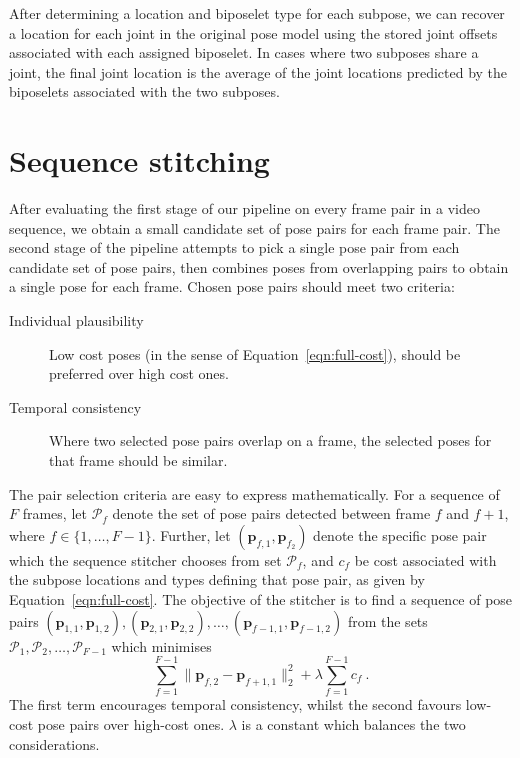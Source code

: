 \documentclass[runningheads]{llncs}
\newcommand{\mat}{\mathbf}
\begin{document}
After determining a location and biposelet type for each subpose, we can recover
a location for each joint in the original pose model using the stored joint
offsets associated with each assigned biposelet. In cases where two subposes
share a joint, the final joint location is the average of the joint locations
predicted by the biposelets associated with the two subposes.

\section{Sequence stitching}\label{sec:stitching}

%


After evaluating the first stage of our pipeline on every frame pair in a video
sequence, we obtain a small candidate set of pose pairs for each frame pair. The
second stage of the pipeline attempts to pick a single pose pair from each
candidate set of pose pairs, then combines poses from overlapping pairs to obtain
a single pose for each frame. Chosen pose pairs should meet two criteria:
%
\begin{description}
\item[Individual plausibility] Low cost poses (in the sense of
Equation~\ref{eqn:full-cost}), should be preferred over high cost ones.
\item[Temporal consistency] Where two selected pose pairs overlap on a frame,
the selected poses for that frame should be similar.
\end{description}

The pair selection criteria are easy to express mathematically. For a sequence
of $F$ frames, let $\mathcal P_f$ denote the set of pose pairs detected between
frame $f$ and $f + 1$, where $f \in \{1, \ldots, F - 1\}$. Further, let $(\mat
p_{f,1}, \mat p_{f_2})$ denote the specific pose pair which the sequence
stitcher chooses from set $\mathcal P_f$, and $c_f$ be cost associated with the
subpose locations and types defining that pose pair, as given by
Equation~\ref{eqn:full-cost}. The objective of the stitcher is to find a
sequence of pose pairs $(\mat p_{1,1}, \mat p_{1,2}), (\mat p_{2,1}, \mat
p_{2,2}), \ldots, (\mat p_{f-1,1}, \mat p_{f-1,2})$ from the sets $\mathcal P_1,
\mathcal P_2, \ldots, \mathcal P_{F-1}$ which minimises
%
\begin{equation}\label{eqn:stitch-cost}
\sum_{f=1}^{F-1} \|\mat p_{f,2} - \mat p_{f+1,1}\|_2^2
+ \lambda \sum_{f=1}^{F-1} c_f~.
\end{equation}
%
The first term encourages temporal consistency, whilst the second favours
low-cost pose pairs over high-cost ones. $\lambda$ is a constant which balances
the two considerations.
\end{document}
